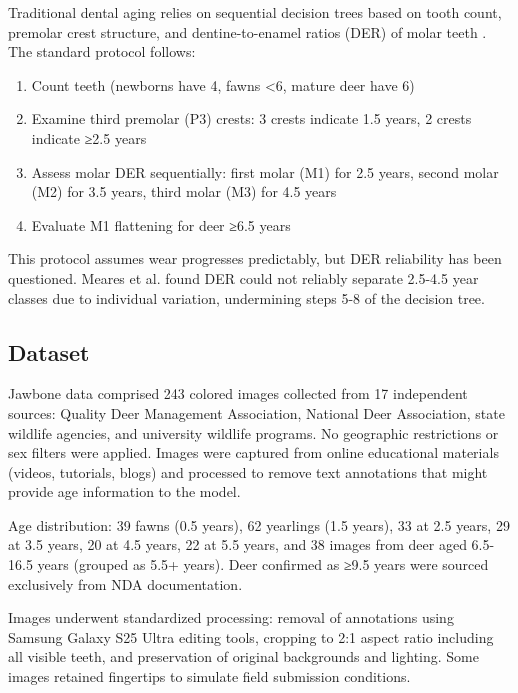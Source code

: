 \documentclass[11pt]{article}
\begin{document}
Traditional dental aging relies on sequential decision trees based on tooth count, premolar crest structure, and dentine-to-enamel ratios (DER) of molar teeth \cite{severinghaus1949tooth, larson1980criteria}. The standard protocol follows:

\begin{enumerate}
    \item Count teeth (newborns have 4, fawns <6, mature deer have 6)
    \item Examine third premolar (P3) crests: 3 crests indicate 1.5 years, 2 crests indicate ≥2.5 years
    \item Assess molar DER sequentially: first molar (M1) for 2.5 years, second molar (M2) for 3.5 years, third molar (M3) for 4.5 years
    \item Evaluate M1 flattening for deer ≥6.5 years
\end{enumerate}

This protocol assumes wear progresses predictably, but DER reliability has been questioned. Meares et al. \cite{meares2006quantitative} found DER could not reliably separate 2.5-4.5 year classes due to individual variation, undermining steps 5-8 of the decision tree.

\subsection{Dataset}

Jawbone data comprised 243 colored images collected from 17 independent sources: Quality Deer Management Association, National Deer Association, state wildlife agencies, and university wildlife programs. No geographic restrictions or sex filters were applied. Images were captured from online educational materials (videos, tutorials, blogs) and processed to remove text annotations that might provide age information to the model.

Age distribution: 39 fawns (0.5 years), 62 yearlings (1.5 years), 33 at 2.5 years, 29 at 3.5 years, 20 at 4.5 years, 22 at 5.5 years, and 38 images from deer aged 6.5-16.5 years (grouped as 5.5+ years). Deer confirmed as ≥9.5 years were sourced exclusively from NDA documentation.

Images underwent standardized processing: removal of annotations using Samsung Galaxy S25 Ultra editing tools, cropping to 2:1 aspect ratio including all visible teeth, and preservation of original backgrounds and lighting. Some images retained fingertips to simulate field submission conditions.
\end{document}
